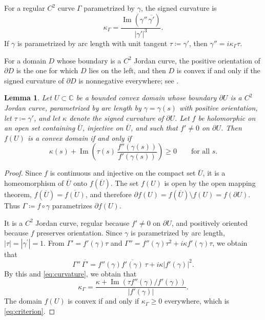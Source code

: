 \documentclass[a4paper, reqno, 11pt]{amsart}
\newtheorem{Lem}[Thm]{Lemma}
\theoremstyle{definition}
\begin{document}
For a regular $C^2$ curve $\Gamma$ parametrized by $\gamma$, the signed curvature is
\begin{equation}\label{eq:curvature}
\kappa_{\Gamma} = \frac{\operatorname{Im}\left( \gamma'' \, \overline{\gamma'} \right)}{|\gamma'|^3} .
\end{equation}
If $\gamma$ is parametrized by arc length with unit tangent $\tau \coloneqq  \gamma'$, then $\gamma'' = i \kappa_{\Gamma} \tau$.




For a domain $D$ whose boundary is a $C^2$ Jordan curve, 
the positive orientation of $\partial D$ is the one for which $D$ lies on the left, and then $D$ is convex if and only if the signed curvature of $\partial D$ is nonnegative everywhere; see \cite[Problems 1.7.5 and 1.7.6, pp.~26--27]{Toponogov2006}. 

\begin{Lem}\label{lem:curvature}
Let $U \subset \mathbb{C}$ be a bounded convex domain whose boundary $\partial U$ is a $C^2$ Jordan curve, parametrized by arc length by $\gamma = \gamma(s)$ with positive orientation, let $\tau \coloneqq  \gamma'$, and let $\kappa$ denote the signed curvature of $\partial U$.
Let $f$ be holomorphic on an open set containing $\overline{U}$, injective on $\overline{U}$, and such that $f' \neq 0$ on $\partial U$.
Then $f(U)$ is a convex domain if and only if
\begin{equation}\label{eq:criterion}
\kappa(s) + \operatorname{Im}\left( \tau(s) \, \frac{f''(\gamma(s))}{f'(\gamma(s))} \right) \ge  0 \qquad \text{for all } s .
\end{equation}
\end{Lem}

\begin{proof}
Since $f$ is continuous and injective on the compact set $\overline{U}$, it is a homeomorphism of $\overline{U}$ onto $f(\overline{U})$.
The set $f(U)$ is open by the open mapping theorem, $f(\overline{U}) = \overline{f(U)}$, and therefore $\partial f(U) = f(\overline{U}) \setminus f(U) = f(\partial U)$.
Thus $\Gamma \coloneqq  f \circ \gamma$ parametrizes $\partial f(U)$. 

It is a $C^2$ Jordan curve, regular because $f' \ne 0$ on $\partial U$, and positively oriented because $f$ preserves orientation. 
Since $\gamma$ is parametrized by arc length, $|\tau| = |\gamma^{\prime}| = 1$. 
From $\Gamma' = f'(\gamma)\tau$ and $\Gamma'' = f''(\gamma)\tau^2 + i\kappa f'(\gamma)\tau$, 
we obtain that 
\begin{equation*}
\Gamma'' \, \overline{\Gamma'} = f''(\gamma)\overline{f'(\gamma)} \, \tau + i\kappa |f'(\gamma)|^2. 
\end{equation*}
By this and \eqref{eq:curvature}, we obtain that 
\begin{equation}\label{eq:image-curvature}
\kappa_{\Gamma} = \frac{\kappa + \operatorname{Im}\left( \tau f''(\gamma)/f'(\gamma) \right)}{|f'(\gamma)|} .
\end{equation}
The domain $f(U)$ is convex if and only if $\kappa_{\Gamma} \ge  0$ everywhere, which is \eqref{eq:criterion}.
\end{proof}
\end{document}
